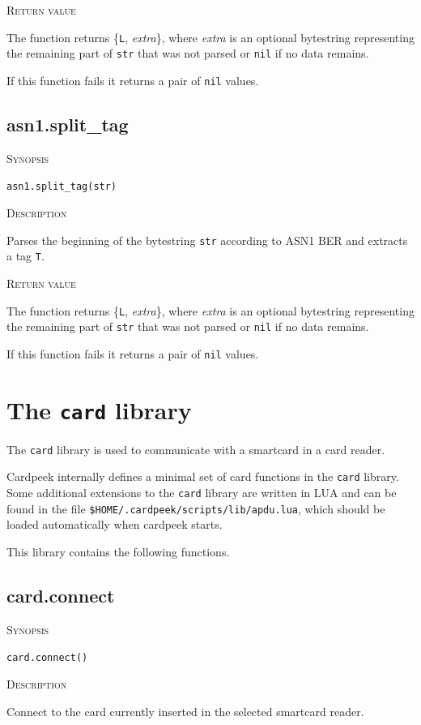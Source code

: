 \documentclass[11pt]{report}
\newcommand{\mansection}[1]{\vspace{0.5em}\par\noindent\textsc{#1}\vspace{0.5em}\par}
\newcommand{\syn}[1]{\texttt{#1}}
\begin{document}
\mansection{Return value}
  The function returns \{\syn{L}, \textit{extra}\}, where \textit{extra} is an optional bytestring 
  representing the remaining part of \syn{str} that was not parsed or \syn{nil} 
  if no data remains.

  If this function fails it returns a pair of \syn{nil} values.


\subsection{asn1.split\_tag}

\mansection{Synopsis}
\syn{asn1.split\_tag(str)}

\mansection{Description}
  Parses the beginning of the bytestring \syn{str} according to ASN1 BER 
  and extracts a tag \syn{T}. 

\mansection{Return value}
  The function returns  \{\syn{L}, \textit{extra}\}, where \textit{extra} is an optional bytestring 
  representing the remaining part of \syn{str} that was not parsed or 
  \syn{nil} if no data remains.

  If this function fails it returns a pair of \syn{nil} values.


\section{The \syn{card} library}

The \syn{card} library is used to communicate with a smartcard in a card reader.

Cardpeek internally defines a minimal set of card functions in the \syn{card} 
library.
Some additional extensions to the \syn{card} library are written in LUA and can
be found in the file \syn{\$HOME/.cardpeek/scripts/lib/apdu.lua}, which should 
be loaded automatically when cardpeek starts.

This library contains the following functions.


\subsection{card.connect}

\mansection{Synopsis}
\syn{card.connect()}

\mansection{Description}
  Connect to the card currently inserted in the selected smartcard reader. 
\end{document}
